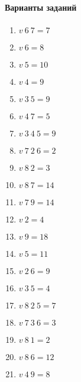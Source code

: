 \documentclass[a4paper,12pt]{article}
\begin{document}
\paragraph{Варианты заданий}
\begin{enumerate}
	\item $v\ 6\ 7 = 7$
	\item $v\ 6 = 8$
	\item $v\ 5 = 10$
	\item $v\ 4 = 9$
	\item $v\ 3\ 5 = 9$
	\item $v\ 4\ 7 = 5$
	\item $v\ 3\ 4\ 5 = 9$
	\item $v\ 7\ 2\ 6 = 2$
	\item $v\ 8\ 2 = 3$
	\item $v\ 8\ 7 = 14$
	\item $v\ 7\ 9 = 14$
	\item $v\ 2 = 4$
	\item $v\ 9 = 18$
	\item $v\ 5 = 11$
	\item $v\ 2\ 6 = 9$
	\item $v\ 3\ 5 = 4$
	\item $v\ 8\ 2\ 5 = 7$
	\item $v\ 7\ 3\ 6 = 3$
	\item $v\ 8\ 1 = 2$
	\item $v\ 8\ 6 = 12$
	\item $v\ 4\ 9 = 8$
\end{enumerate}
\end{document}
